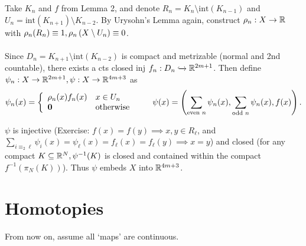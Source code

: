 \documentclass{natsirt}
\newcommand{\x}{\\ \phantom{a} \\}
\newcounter{def}[section]
\begin{document}
Take $K_n$ and $f$ from Lemma 2, and denote $R_n = K_n\setminus\text{int}(K_{n-1})$ and $U_n = \text{int}(K_{n+1})\setminus K_{n-2}$. By Urysohn's Lemma again, construct $\rho_n: X\rightarrow\mathbb{R}$ with $\rho_n(R_n) \equiv 1, \rho_n\left( X\setminus U_n \right) \equiv 0$.
\x
Since $D_n = K_{n+1} \setminus \text{int}(K_{n-2})$ is compact and metrizable (normal and 2nd countable), there exists a cts closed inj $f_n: D_n\xhookrightarrow{}\mathbb{R}^{2m+1}$. Then define $\psi_n:X\rightarrow\mathbb{R}^{2m+1}, \psi: X\rightarrow \mathbb{R}^{4m+3}$ as
\begin{align*}
    \psi_n(x) = \left\{ \begin{array}{ll}
    \rho_n(x) f_n(x) & x\in U_n\\
    \textbf{0} & \text{otherwise}
    \end{array}\right.\qquad \psi(x) = \left( \sum_{\text{even }n}\psi_n(x), \sum_{\text{odd }n}\psi_n(x), f(x) \right).
\end{align*}

$\psi$ is injective (Exercise: $f(x)=f(y)\implies x,y \in R_\ell$, and $\sum_{i\equiv_2 \ell} \psi_i(x) = \psi_\ell(x) = f_\ell(x) = f_\ell(y)\implies x = y$) and closed (for any compact $K\subseteq \mathbb{R}^{N}, \psi^{-1}(K)$ is closed and contained within the compact $f^{-1}(\pi_N(K))$). Thus $\psi$ embeds $X$ into $\mathbb{R}^{4m+3}$.\QED

\section{Homotopies}

From now on, assume all `maps' are continuous.
\end{document}

